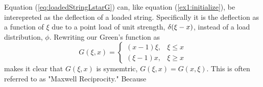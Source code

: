 \begin{example}
    Equation (\ref{eq:loadedStringLstarG}) can, like equation (\ref{ex1:initialize}), be interepreted as the deflection of a loaded string. Specifically it is the deflection as a function of \(\xi\) due to a point load of unit strength, \(\delta(\xi-x)\), instead of a load distribution, \(\phi\). Rewriting our Green's function as
    \begin{equation}
        G(\xi,x)= \begin{cases}
            (x-1)\xi, & \xi \leq x\\
            (\xi-1)x, & \xi \geq x
        \end{cases}
    \end{equation}
    makes it clear that \(G(\xi,x)\) is symemtric, \(G(\xi,x)=G(x,\xi)\). This is often referred to as "Maxwell Reciprocity." Because 
\end{example}